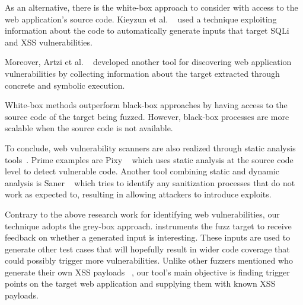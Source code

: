As an alternative, there is the white-box approach to consider with access to the web application's source code. Kieyzun et al. ~\cite{kieyzun2009automatic} used a technique exploiting information about the code to automatically generate inputs that target SQLi and XSS vulnerabilities. 

Moreover, Artzi et al. ~\cite{artzi2010finding} developed another tool for discovering web
application vulnerabilities by collecting information about the target extracted through concrete and symbolic execution.

White-box methods outperform black-box approaches by having access to the source code of the target being fuzzed. However, black-box processes are more scalable when the source code is not 
available. 

To conclude, web vulnerability scanners are also realized through static analysis tools~\cite{balzarotti2008saner,jovanovic2006pixy,jovanovic2006precise,medeiros2014mining,medeiros2016dekant}. Prime examples are Pixy ~\cite{jovanovic2006pixy} which uses static analysis at the source code
level to detect vulnerable code. Another tool combining static and dynamic analysis is Saner ~\cite{balzarotti2008saner} which tries to identify any sanitization processes that do not work as expected to, resulting in allowing attackers to introduce exploits.

Contrary to the above research work for identifying web vulnerabilities, our technique adopts the
grey-box approach. \pname{} instruments the fuzz target to receive feedback on whether a generated input is interesting. These inputs are used to generate other test cases that will hopefully result in wider code coverage that could possibly trigger more vulnerabilities. Unlike other fuzzers mentioned who generate their own XSS payloads ~\cite{duchene2014kameleonfuzz}, our tool's  main objective is finding trigger points on the target web application and supplying them with known XSS payloads.